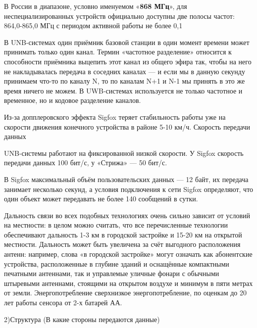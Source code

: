 В России в диапазоне, условно именуемом «\textbf{868 МГц}», для неспециализированных устройств официально доступны две полосы частот: 864,0-865,0 МГц с периодом активной работы не более 0,1%

В UNB-системах один приёмник базовой станции в один момент времени может принимать только один канал.  Термин «частотное разделение» относится к способности приёмника выцепить этот канал из общего эфира так, чтобы на него не накладывалась передача в соседних каналах — и если мы в данную секунду принимаем что-то по каналу N, то по каналам N+1 и N-1 мы принять в это же время ничего не можем. В UWB-системах используется не только частотное и временное, но и кодовое разделение каналов.  

Из-за допплеровского эффекта Sigfox теряет стабильность работы уже на скорости движения конечного устройства в районе 5-10 км/ч. 
Скорость передачи данных

UNB-системы работают на фиксированной низкой скорости. У Sigfox скорость передачи данных 100 бит/с, у «Стрижа» — 50 бит/с.

В Sigfox максимальный объём пользовательских данных — 12 байт, их передача занимает несколько секунд, а условия подключения к сети Sigfox определяют, что один объект может передавать не более 140 сообщений в сутки.

Дальность связи во всех подобных технологиях очень сильно зависит от условий на местности: в целом можно считать, что все перечисленные технологии обеспечивают дальность 1-3 км в городской застройке и 15-20 км на открытой местности. Дальность может быть увеличена за счёт выгодного расположения антенн: например, слова «в городской застройке» могут означать как абонентские устройства, расположенные в глубине зданий и оснащённые компактными печатными антеннами, так и управлемые уличные фонари с обычными штыревыми антеннами, стоящими на открытом воздухе и минимум в пяти метрах от земли.
Энергопотребление
сверхнизкое энергопотребление, по оценкам до 20 лет работы сенсора от 2-х батарей АА. 

2)Структура (В какие стороны передаются данные)



















